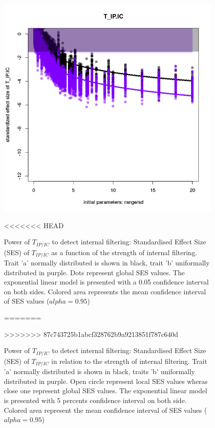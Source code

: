 \documentclass[12pt]{article}\usepackage[]{graphicx}\usepackage[]{color}
\makeatletter
\def\maxwidth{ %
  \ifdim\Gin@nat@width>\linewidth
    \linewidth
  \else
    \Gin@nat@width
  \fi
}
\newenvironment{knitrout}{}{} %
\makeatother
\begin{document}
\begin{landscape}
\begin{table}[ht]
{\begin{knitrout}
\begin{figure}
{\centering \includegraphics[width=\maxwidth]{figure/In_conc_plot-1} 

}

<<<<<<< HEAD
\caption[Power of $T_{IP/IC}$ to detect internal filtering]{Power of $T_{IP/IC}$ to detect internal filtering: Standardised Effect Size (SES) of $T_{IP/IC}$ as a function of the strength of internal filtering. Trait 'a' normally distributed is shown in black, trait 'b' uniformally distributed in purple. Dots represent global SES values. The exponential linear model is presented with a 0.05 confidence interval on both sides. Colored area represents the mean confidence interval of SES values ($alpha = 0.95$)}\label{fig:In_conc_plot}
=======
\caption[Power of $T_{IP/IC}$ to detect internal filtering]{Power of $T_{IP/IC}$ to detect internal filtering: Standardised Effect Size (SES) of $T_{IP/IC}$ in relation to the strength of internal filtering. Trait 'a' normally distributed is shown in black, traits 'b' uniformally distributed in purple. Open circle represent local SES values wheras close one represent global SES values. The exponential linear model is presented with 5 percents confidence interval on both side. Colored area represent the mean confidence interval of SES values ($alpha = 0.95$)}\label{fig:In_conc_plot}
>>>>>>> 87c743725b1abcf328762b9a9213851f787c640d
\end{figure}



\end{knitrout}}
\end{table}
\end{landscape}
\end{document}
